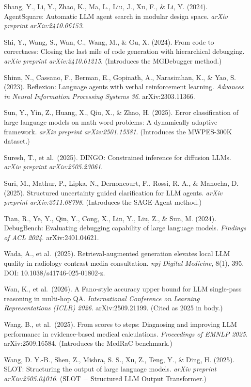 \documentclass[
]{article}
\begin{document}
Shang, Y., Li, Y., Zhao, K., Ma, L., Liu, J., Xu, F., \& Li, Y. (2024).
AgentSquare: Automatic LLM agent search in modular design space.
\emph{arXiv preprint arXiv:2410.06153}.

Shi, Y., Wang, S., Wan, C., Wang, M., \& Gu, X. (2024). From code to
correctness: Closing the last mile of code generation with hierarchical
debugging. \emph{arXiv preprint arXiv:2410.01215}. (Introduces the
MGDebugger method.)

Shinn, N., Cassano, F., Berman, E., Gopinath, A., Narasimhan, K., \&
Yao, S. (2023). Reflexion: Language agents with verbal reinforcement
learning. \emph{Advances in Neural Information Processing Systems 36}.
arXiv:2303.11366.

Sun, Y., Yin, Z., Huang, X., Qiu, X., \& Zhao, H. (2025). Error
classification of large language models on math word problems: A
dynamically adaptive framework. \emph{arXiv preprint arXiv:2501.15581}.
(Introduces the MWPES-300K dataset.)

Suresh, T., et al.~(2025). DINGO: Constrained inference for diffusion
LLMs. \emph{arXiv preprint arXiv:2505.23061}.

Suri, M., Mathur, P., Lipka, N., Dernoncourt, F., Rossi, R. A., \&
Manocha, D. (2025). Structured uncertainty guided clarification for LLM
agents. \emph{arXiv preprint arXiv:2511.08798}. (Introduces the
SAGE-Agent method.)

Tian, R., Ye, Y., Qin, Y., Cong, X., Lin, Y., Liu, Z., \& Sun, M.
(2024). DebugBench: Evaluating debugging capability of large language
models. \emph{Findings of ACL 2024}. arXiv:2401.04621.

Wada, A., et al.~(2025). Retrieval-augmented generation elevates local
LLM quality in radiology contrast media consultation. \emph{npj Digital
Medicine}, 8(1), 395. DOI: 10.1038/s41746-025-01802-z.

Wan, K., et al.~(2026). A Fano-style accuracy upper bound for LLM
single-pass reasoning in multi-hop QA. \emph{International Conference on
Learning Representations (ICLR) 2026}. arXiv:2509.21199. (Cited as 2025
in body.)

Wang, B., et al.~(2025). From scores to steps: Diagnosing and improving
LLM performance in evidence-based medical calculations.
\emph{Proceedings of EMNLP 2025}. arXiv:2509.16584. (Introduces the
MedRaC benchmark.)

Wang, D. Y.-B., Shen, Z., Mishra, S. S., Xu, Z., Teng, Y., \& Ding, H.
(2025). SLOT: Structuring the output of large language models.
\emph{arXiv preprint arXiv:2505.04016}. (SLOT = Structured LLM Output
Transformer.)
\end{document}
